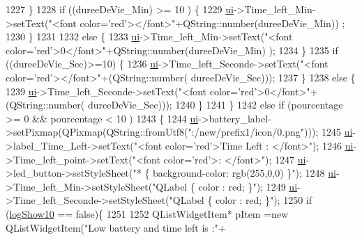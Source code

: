 \begin{DoxyCode}
{1227               \}
1228               \textcolor{keywordflow}{if} ((dureeDeVie\_Min) >=  10 ) \{
1229                   \hyperlink{a00008_a6dc041ef6a2ffb329928d2913e8344e6}{ui}->Time\_left\_Min->setText(\textcolor{stringliteral}{"<font color='red'></font>"}+QString::number(dureeDeVie\_Min))
      ;
1230               \}
1231 
1232               \textcolor{keywordflow}{else} \{
1233                   \hyperlink{a00008_a6dc041ef6a2ffb329928d2913e8344e6}{ui}->Time\_left\_Min->setText(\textcolor{stringliteral}{"<font color='red'>0</font>"}+QString::number(dureeDeVie\_Min)
      );
1234               \}
1235               \textcolor{keywordflow}{if} ((dureeDeVie\_Sec)>=10) \{
1236                   \hyperlink{a00008_a6dc041ef6a2ffb329928d2913e8344e6}{ui}->Time\_left\_Seconde->setText(\textcolor{stringliteral}{"<font color='red'></font>"}+(QString::number(
      dureeDeVie\_Sec)));
1237               \}
1238               \textcolor{keywordflow}{else} \{
1239                   \hyperlink{a00008_a6dc041ef6a2ffb329928d2913e8344e6}{ui}->Time\_left\_Seconde->setText(\textcolor{stringliteral}{"<font color='red'>0</font>"}+(QString::number(
      dureeDeVie\_Sec)));
1240               \}
1241          \}
1242           \textcolor{keywordflow}{else} \textcolor{keywordflow}{if} (pourcentage >= 0 && pourcentage < 10 )
1243           \{
1244               \hyperlink{a00008_a6dc041ef6a2ffb329928d2913e8344e6}{ui}->battery\_label->setPixmap(QPixmap(QString::fromUtf8(\textcolor{stringliteral}{":/new/prefix1/icon/0.png"})));
1245               \hyperlink{a00008_a6dc041ef6a2ffb329928d2913e8344e6}{ui}->label\_Time\_Left->setText(\textcolor{stringliteral}{"<font color='red'>Time Left : </font>"});
1246               \hyperlink{a00008_a6dc041ef6a2ffb329928d2913e8344e6}{ui}->Time\_left\_point->setText(\textcolor{stringliteral}{"<font color='red'>: </font>"});
1247               \hyperlink{a00008_a6dc041ef6a2ffb329928d2913e8344e6}{ui}->led\_button->setStyleSheet(\textcolor{stringliteral}{"* \{ background-color: rgb(255,0,0) \}"});
1248               \hyperlink{a00008_a6dc041ef6a2ffb329928d2913e8344e6}{ui}->Time\_left\_Min->setStyleSheet(\textcolor{stringliteral}{"QLabel \{ color : red; \}"});
1249               \hyperlink{a00008_a6dc041ef6a2ffb329928d2913e8344e6}{ui}->Time\_left\_Seconde->setStyleSheet(\textcolor{stringliteral}{"QLabel \{ color : red; \}"});
1250               \textcolor{keywordflow}{if} (\hyperlink{a00008_a9a99ef269d152d9109dc5ec3365a0c4f}{logShow10} == \textcolor{keyword}{false})\{
1251 
1252                   QListWidgetItem* pItem =\textcolor{keyword}{new} QListWidgetItem(\textcolor{stringliteral}{"Low battery and time left is :"}+ 
}
\end{DoxyCode}
